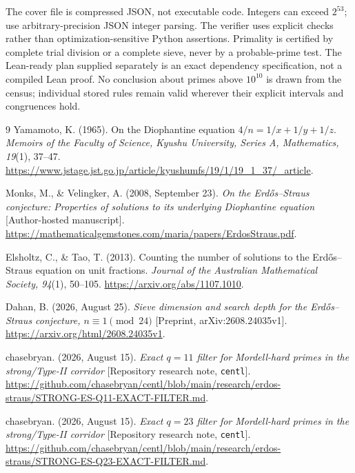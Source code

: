 \documentclass[11pt]{article}
\theoremstyle{definition}\newtheorem{definition}[theorem]{Definition}
\theoremstyle{remark}\newtheorem{remark}[theorem]{Remark}
\begin{document}
The cover file is compressed JSON, not executable code. Integers can exceed $2^{53}$; use arbitrary-precision JSON integer parsing. The verifier uses explicit checks rather than optimization-sensitive Python assertions. Primality is certified by complete trial division or a complete sieve, never by a probable-prime test. The Lean-ready plan supplied separately is an exact dependency specification, not a compiled Lean proof. No conclusion about primes above $10^{10}$ is drawn from the census; individual stored rules remain valid wherever their explicit intervals and congruences hold.

\begin{thebibliography}{9}
Yamamoto, K. (1965). On the Diophantine equation $4/n=1/x+1/y+1/z$.
\emph{Memoirs of the Faculty of Science, Kyushu University, Series A, Mathematics, 19}(1), 37--47.
\url{https://www.jstage.jst.go.jp/article/kyushumfs/19/1/19_1_37/_article}.

Monks, M., \& Velingker, A. (2008, September 23).
\emph{On the Erd\H{o}s--Straus conjecture: Properties of solutions to its underlying Diophantine equation} [Author-hosted manuscript].
\url{https://mathematicalgemstones.com/maria/papers/ErdosStraus.pdf}.

Elsholtz, C., \& Tao, T. (2013). Counting the number of solutions to the Erd\H{o}s--Straus equation on unit fractions.
\emph{Journal of the Australian Mathematical Society, 94}(1), 50--105.
\url{https://arxiv.org/abs/1107.1010}.

Dahan, B. (2026, August 25).
\emph{Sieve dimension and search depth for the Erd\H{o}s--Straus conjecture, $n\equiv1\pmod{24}$} [Preprint, arXiv:2608.24035v1].
\url{https://arxiv.org/html/2608.24035v1}.

chasebryan. (2026, August 15).
\emph{Exact $q=11$ filter for Mordell-hard primes in the strong/Type-II corridor} [Repository research note, \texttt{centl}].
\url{https://github.com/chasebryan/centl/blob/main/research/erdos-straus/STRONG-ES-Q11-EXACT-FILTER.md}.

chasebryan. (2026, August 15).
\emph{Exact $q=23$ filter for Mordell-hard primes in the strong/Type-II corridor} [Repository research note, \texttt{centl}].
\url{https://github.com/chasebryan/centl/blob/main/research/erdos-straus/STRONG-ES-Q23-EXACT-FILTER.md}.
\end{thebibliography}
\end{document}

